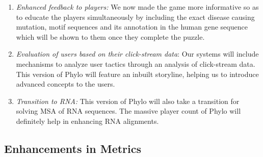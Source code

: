 \documentclass{article}
\begin{document}
\begin{enumerate}
  \item \textit{Enhanced feedback to players:}   
We now made the game more informative so as to educate the players simultaneously by including the exact disease causing mutation, motif sequences and its annotation in the human gene sequence which will be shown to them once they complete the puzzle.
  \item \textit{Evaluation of users based on their click-stream data}: Our systems will include mechanisms to analyze user tactics through an analysis of click-stream data. This version of Phylo will feature an inbuilt storyline, helping us to introduce advanced concepts to the users.
% 
% 
  \item \textit{Transition to RNA:} This version of Phylo will also take a transition for solving MSA of RNA sequences. The massive player count of Phylo will definitely help in enhancing RNA alignments.
  
\end{enumerate}
\subsection{Enhancements in Metrics}

\end{document}

